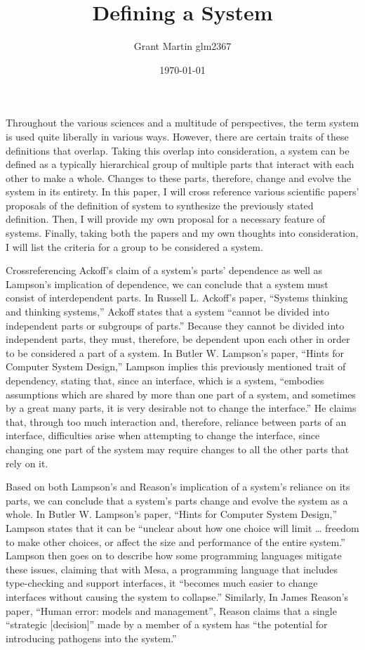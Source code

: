 \documentclass[11pt]{article}
\title{Defining a System}
\author{Grant Martin glm2367}
\date{\today}
\begin{document}
\maketitle

Throughout the various sciences and a multitude of perspectives, the term system is used quite liberally in various ways. However, there are certain traits of these definitions that overlap. Taking this overlap into consideration, a system can be defined as a typically hierarchical group of multiple parts that interact with each other to make a whole. Changes to these parts, therefore, change and evolve the system in its entirety. In this paper, I will cross reference various scientific papers' proposals of the definition of system to synthesize the previously stated definition. Then, I will provide my own proposal for a necessary feature of systems. Finally, taking both the papers and my own thoughts into consideration, I will list the criteria for a group to be considered a system.
\par Crossreferencing Ackoff's claim of a system's parts' dependence as well as Lampson's implication of dependence, we can conclude that a system must consist of interdependent parts. In Russell  L.  Ackoff's paper, ``Systems thinking and thinking systems,'' Ackoff states that a system ``cannot be divided  into  independent  parts  or subgroups  of parts.''\cite{ackoff:1994} Because they cannot be divided into independent parts, they must, therefore, be dependent upon each other in order to be considered a part of a system. In Butler W. Lampson's paper, ``Hints for Computer System Design,'' Lampson implies this previously mentioned trait of dependency, stating that, since an interface, which is a system, ``embodies assumptions which are shared by more than one part of a system, and sometimes by a great many parts, it is very desirable not to change the interface.''\cite{lampson:1983} He claims that, through too much interaction and, therefore, reliance between parts of an interface, difficulties arise when attempting to change the interface, since changing one part of the system may require changes to all the other parts that rely on it. 
\par Based on both Lampson's and Reason's implication of a system's reliance on its parts, we can conclude that a system's parts change and evolve the system as a whole. In Butler W. Lampson's paper, ``Hints for Computer System Design,'' Lampson states that it can be ``unclear about how one choice will limit … freedom to make other choices, or affect the size and performance of the entire system.''\cite{lampson:1983} Lampson then goes on to describe how some programming languages mitigate these issues, claiming that with Mesa, a programming language that includes type-checking and support interfaces, it ``becomes much easier to change interfaces without causing the system to collapse.'' \cite{lampson:1983} Similarly, In James  Reason's paper, ``Human error: models and management'', Reason claims that a single ``strategic [decision]'' made by a member of a system has ``the potential   for   introducing   pathogens   into   the system.''\cite{reason:2000}
\end{document}
